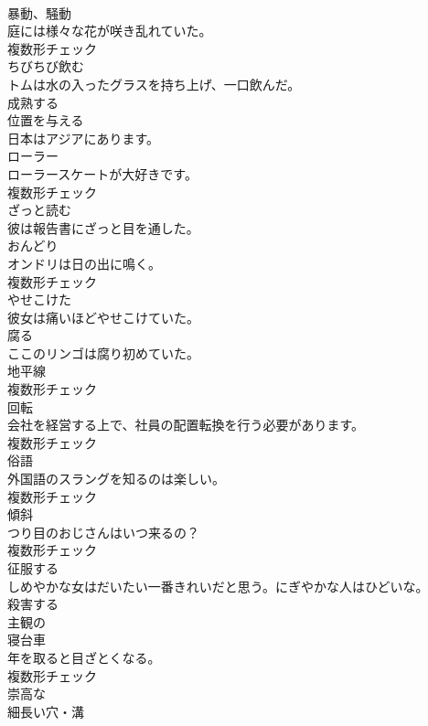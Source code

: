\documentclass[8pt]{extreport}
\begin{document}
\begin{CJK}{UTF8}{min}
\\	[名詞]	暴動、騒動	
\\	庭には様々な花が咲き乱れていた。	
\\	複数形チェック
\\	[動詞]	ちびちび飲む	
\\	トムは水の入ったグラスを持ち上げ、一口飲んだ。	
\\	[動詞]	成熟する	
\\	[動詞]	位置を与える	
\\	日本はアジアにあります。	
\\	[名詞]	ローラー	
\\	ローラースケートが大好きです。	
\\	複数形チェック
\\	[動詞]	ざっと読む	
\\	彼は報告書にざっと目を通した。	
\\	[名詞]	おんどり	
\\	オンドリは日の出に鳴く。	
\\	複数形チェック
\\	[形容詞]	やせこけた	
\\	彼女は痛いほどやせこけていた。	
\\	[動詞]	腐る	
\\	ここのリンゴは腐り初めていた。	
\\	[名詞]	地平線	
\\	複数形チェック
\\	[名詞]	回転	
\\	会社を経営する上で、社員の配置転換を行う必要があります。	
\\	複数形チェック
\\	[名詞]	俗語	
\\	外国語のスラングを知るのは楽しい。	
\\	複数形チェック
\\	[名詞]	傾斜	
\\	つり目のおじさんはいつ来るの？	
\\	複数形チェック
\\	[動詞]	征服する	
\\	しめやかな女はだいたい一番きれいだと思う。にぎやかな人はひどいな。	
\\	[動詞]	殺害する	
\\	[形容詞]	主観の	
\\	[名詞]	寝台車	
\\	年を取ると目ざとくなる。	
\\	複数形チェック
\\	[形容詞]	崇高な	
\\	[名詞]	細⻑い穴・溝	

\end{CJK}
\end{document}
